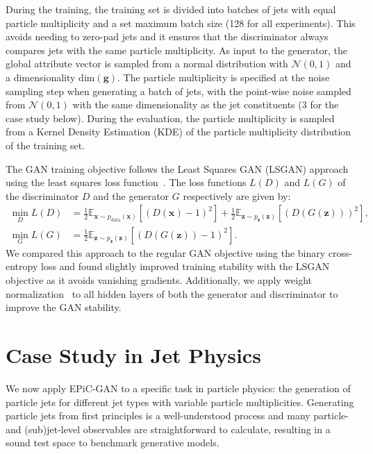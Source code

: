 \documentclass[a4paper,submission, Phys]{SciPost}
\begin{document}
During the training, the training set is divided into batches of jets with equal particle multiplicity and a set maximum batch size (128 for all experiments).
%
This avoids needing to zero-pad jets and it ensures that the discriminator always compares jets with the same particle multiplicity.
%
As input to the generator, the global attribute vector is sampled from a normal distribution with $\mathcal{N}(0,1)$ and a dimensionality $\text{dim}(\boldsymbol{g})$. 
%
The particle multiplicity is specified at the noise sampling step when generating a batch of jets, with the point-wise noise sampled from $\mathcal{N}(0,1)$ with the same dimensionality as the jet constituents (3 for the case study below).
%
During the evaluation, the particle multiplicity is sampled from a Kernel Density Estimation (KDE) of the particle multiplicity distribution of the training set.







The GAN training objective follows the Least Squares GAN (LSGAN) approach using the least squares loss function~\cite{LSGAN}. 
%
The loss functions $L(D)$ and $L(G)$ of the discriminator $D$ and the generator $G$ respectively are given by:  
%
\begin{align}
    \min_D L(D) &= \frac{1}{2} \mathbb{E}_{\boldsymbol{x}\sim p_\mathrm{data}(\boldsymbol{x})}[(D(\boldsymbol{x})-1)^2] + \frac{1}{2} \mathbb{E}_{\boldsymbol{z}\sim p_\mathrm{\boldsymbol{z}}(\boldsymbol{z})}[(D(G(\boldsymbol{z})))^2], \\
    \min_G L(G) &= \frac{1}{2} \mathbb{E}_{\boldsymbol{z}\sim p_\mathrm{\boldsymbol{z}}(\boldsymbol{z})}[(D(G(\boldsymbol{z}))-1)^2].
\end{align}
%
We compared this approach to the regular GAN objective using the binary cross-entropy loss and found slightly improved training stability with the LSGAN objective as it avoids vanishing gradients.
%
Additionally, we apply weight normalization~\cite{salimans2016weight_normalisation} to all hidden layers of both the generator and discriminator to improve the GAN stability.






\section{Case Study in Jet Physics}
\label{sec:case_study}


We now apply EPiC-GAN to a specific task in particle physics: the generation of particle jets for different jet types with variable particle multiplicities. 
%
Generating particle jets from first principles is a well-understood process and many particle- and (sub)jet-level observables are straightforward to calculate, resulting in a sound test space to benchmark generative models.
\end{document}
